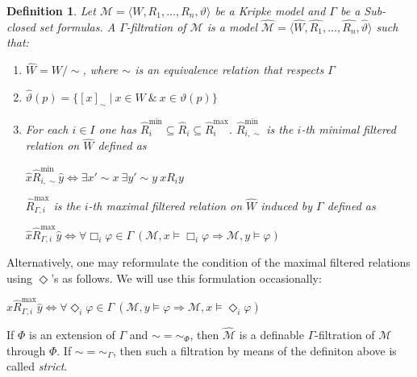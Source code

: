 \documentclass[a4paper]{article}
\theoremstyle{defin}
\newtheorem{defin}{Definition}
\theoremstyle{theorem}
\theoremstyle{prop}
\theoremstyle{lemma}
\theoremstyle{fact}
\theoremstyle{exercise}
\theoremstyle{ex}
\theoremstyle{col}
\theoremstyle{claim}
\begin{document}
\begin{defin}
  Let $\mathcal{M} = \langle W, R_1, \dots, R_n, \vartheta \rangle$ be a Kripke model and $\Gamma$ be a Sub-closed set formulas. A $\Gamma$-filtration of $\mathcal{M}$ is a model
  $\widehat{\mathcal{M}} = \langle \widehat{W}, \widehat{R_1}, \dots, \widehat{R_n}, \widehat{\vartheta} \rangle$ such that:
  \begin{enumerate}
    \item $\widehat{W} = W / \sim$, where $\sim$ is an equivalence relation that respects $\Gamma$
    \item $\widehat{\vartheta}(p) = \{ [x]_{\sim} \: | \: x \in W \: \& \: x \in \vartheta(p)\}$
    \item For each $i \in I$ one has $\widehat{R}_i^{\text{min}} \subseteq \widehat{R}_i \subseteq \widehat{R}_i^{\text{max}}$. $\widehat{R}_{i, \sim}^{\text{min}}$ is the $i$-th minimal filtered relation on $\widehat{W}$ defined as
    \begin{center}
      $\hat{x} \widehat{R}_{i, \sim}^{\text{min}} \hat{y} \Leftrightarrow \exists x' \sim x \: \exists y' \sim y \: x R_i y$
    \end{center}
    $\widehat{R}_{\Gamma,i}^{\text{max}}$ is the $i$-th maximal filtered relation on $\widehat{W}$ induced by $\Gamma$ defined as
    \begin{center}
      $\hat{x} \widehat{R}_{\Gamma,i}^{\text{max}} \hat{y} \Leftrightarrow \forall \Box_i \varphi \in \Gamma \: (\mathcal{M}, x \models \Box_i \varphi \Rightarrow \mathcal{M}, y \models \varphi)$
    \end{center}
  \end{enumerate}
\end{defin}

Alternatively, one may reformulate the condition of the maximal filtered relations using $\Diamond$'s as follows. We will use this formulation occasionally:

\begin{center}
  $\hat{x} \widehat{R}_{\Gamma,i}^{\text{max}} \hat{y} \Leftrightarrow \forall \Diamond_i \varphi \in \Gamma \: (\mathcal{M}, y \models \varphi \Rightarrow \mathcal{M}, x \models \Diamond_i \varphi)$
\end{center}

If $\Phi$ is an extension of $\Gamma$ and $\sim = \sim_{\Phi}$, then $\widehat{\mathcal{M}}$ is a definable $\Gamma$-filtration of $\mathcal{M}$ through $\Phi$. If $\sim = \sim_{\Gamma}$, then such a filtration by means of the definiton above is called \emph{strict}.
\end{document}
